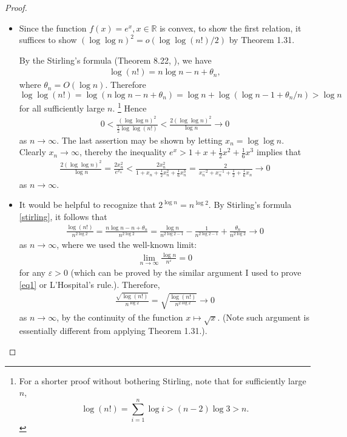 \documentclass{article}
\newcommand{\eps}{\varepsilon}
\newcommand{\real}{\mathbb{R}}
\theoremstyle{definition}
\theoremstyle{plain}
\theoremstyle{remark}
\begin{document}
\begin{description}
\begin{proof}
\begin{itemize}
\item
Since the function $f(x) = e^x, x \in \real$ is convex, to show the first relation, it 
suffices to show $(\log\log n)^2 = o(\log\log(n!)/2)$ by Theorem 1.31.

By the Stirling's formula (Theorem 8.22, \cite{rudin1964}), we have 
\begin{align}\label{stirling}
    \log(n!) = n\log n - n + \theta_n,
\end{align}
where $\theta_n = O(\log n)$. Therefore $\log\log(n!) = \log(n\log n - n + \theta_n) 
= \log n + \log(\log n - 1 + \theta_n/n) > \log n$ for all sufficiently large $n$. \footnote{For a shorter proof without bothering
Stirling, note that for sufficiently large $n$, $$\log(n!) = \sum_{i = 1}^n \log i > (n - 2)\log 3 > n.$$} Hence
\begin{align}\label{eq1}
    0 < \frac{(\log\log n)^2}{\frac{1}{2}\log\log(n!)} <
    \frac{2(\log\log n)^2}{\log n} \to 0
\end{align}
as $n \to \infty$. The last assertion may be shown by letting $x_n = \log\log n$.
Clearly $x_n \to \infty$, thereby the inequality $e^x > 1 + x + \frac{1}{2}x^2 + \frac{1}{6}x^3$ implies that
\begin{align*}
    \frac{2(\log\log n)^2}{\log n} = \frac{2x_n^2}{e^{x_n}} < \frac{2x_n^2}{1 + x_n + \frac{1}{2}x_n^2 + \frac{1}{6}x_n^3} = \frac{2}{x_n^{-2} + x_n^{-1} + \frac{1}{2} + 
    \frac{1}{6}x_n} \to 0 
\end{align*}
as $n \to \infty$. 

\item It would be helpful to recognize that $2^{\log n} = n^{\log 2}$. By Stirling's formula
\eqref{stirling}, it follows that
\begin{align*}
    \frac{\log(n!)}{n^{2\log 2}} = \frac{n\log n - n + \theta_n}{n^{2\log 2}} = 
    \frac{\log n}{n^{2\log 2 - 1}} - \frac{1}{n^{2\log 2 - 1}} + \frac{\theta_n}{n^{2\log 2}} \to 0
\end{align*}
as $n \to \infty$, where we used the well-known limit:
\begin{align*}
    \lim_{n \to \infty} \frac{\log n}{n^\eps} = 0
\end{align*}
for any $\eps > 0$ (which can be proved by the similar argument I used to prove 
\eqref{eq1} or L'Hospital's rule.). Therefore,
\begin{align*}
    \frac{\sqrt{\log(n!)}}{n^{\log 2}} = \sqrt{\frac{\log(n!)}{n^{2\log 2}}} \to 0
\end{align*}
as $n \to \infty$, by the continuity of the function $x \mapsto \sqrt{x}$. (Note such 
argument is essentially different from applying Theorem 1.31.).


\end{itemize}
\end{proof}
\end{description}
\end{document}

